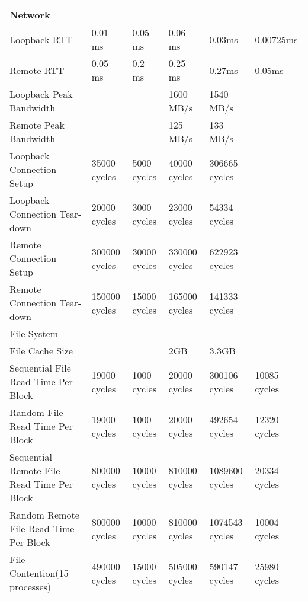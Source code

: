\small
\begin{center}
\begin{tabular}{| p{4cm} | p{2cm} | p{2cm} | p{2cm} | p{2.5cm} | p{2cm}} 

\hline 
Network & & & & & \\
\hline
Loopback RTT & 0.01 ms & 0.05 ms& 0.06 ms & 0.03ms & 0.00725ms \\
Remote RTT & 0.05 ms& 0.2 ms & 0.25 ms & 0.27ms & 0.05ms\\
Loopback Peak Bandwidth & & & 1600 MB/s & 1540 MB/s \\
Remote Peak Bandwidth & & &  125 MB/s  & 133 MB/s\\
Loopback Connection Setup & 35000 cycles& 5000 cycles& 40000 cycles& 306665 cycles \\
Loopback Connection Tear-down & 20000 cycles& 3000 cycles& 23000 cycles& 54334 cycles \\
Remote Connection Setup & 300000  cycles& 30000 cycles& 330000 cycles& 622923 cycles\\
Remote Connection Tear-down & 150000  cycles& 15000 cycles& 165000 cycles& 141333 cycles\\

\hline 
File System& & & & \\
\hline
File Cache Size & & & 2GB & 3.3GB \\ 
Sequential File Read Time Per Block& 19000 cycles & 1000 cycles& 20000 cycles& 300106 cycles & 10085 cycles\\
Random File Read Time Per Block& 19000 cycles& 1000 cycles& 20000 cycles& 492654 cycles & 12320 cycles \\
Sequential Remote File Read Time Per Block& 800000 cycles& 10000 cycles& 810000 cycles& 1089600 cycles & 20334 cycles\\
Random Remote File Read Time Per Block& 800000 cycles& 10000 cycles& 810000 cycles& 1074543 cycles & 10004 cycles\\
File Contention(15 processes) & 490000 cycles& 15000 cycles& 505000 cycles& 590147 cycles & 25980 cycles \\

\end{tabular}
\end{center}